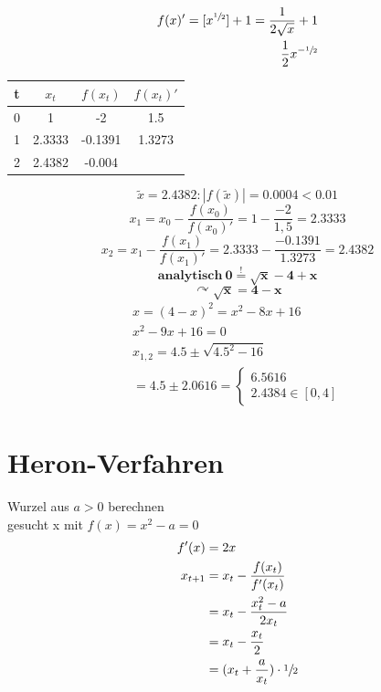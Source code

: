 \documentclass{article}
\begin{document}
	\begin{eqnarray*}
		f(x)'=[x^{\sfrac{1}{2}}] + 1 = \frac{1}{2\sqrt{x}} + 1 \\
		\frac{1}{2}x^{-\sfrac{1}{2}}
	\end{eqnarray*}
	\begin{table}[h!]
  		\centering
  		\label{tab:table1}
  		\begin{tabular}{c | c c c}
    		t & ${x_t}$ & $f(x_t)$ & $f(x_t)'$\\
    		\hline
    		0 & 1 & -2 & 1.5\\
    		1 & 2.3333 & -0.1391 & 1.3273\\
    		2 & 2.4382 & -0.004 & \\
  		\end{tabular}
	\end{table}
	\[\tilde{x} = 2.4382 : |f(\tilde{x})|=0.0004 < 0.01 \]
	\[x_1=x_0 - \frac{f(x_0)}{f(x_0)'} = 1 - \frac{-2}{1,5} = 2.3333 \]
	\[x_2=x_1 - \frac{f(x_1)}{f(x_1)'} = 2.3333 - \frac{-0.1391}{1.3273}	= 2.4382
	\]
	\[\pmb{analytisch \ 0 \stackrel{!}{=} \sqrt{x}-4+x}\]
	\[\pmb{\curvearrowright \sqrt{x} = 4-x}\]
	\begin{align*}
	x = (4-x)^2=x^2-8x+16 \\
	x^2 -9x + 16 = 0 \\
	x_{1,2}=4.5\pm\sqrt{4.5^2-16} \\
	=4.5\pm 2.0616=
    \begin{cases}
		6.5616  \\
		2.4384 \in [0,4]
	\end{cases}	
	\end{align*}
	\section{Heron-Verfahren}
	Wurzel aus \begin{math} a > 0 \end{math} berechnen \\
	gesucht x mit \begin{math} f(x) = x^2 - a = 0 \end{math}
	\begin{align*}
	f'(x)&=2x \\
	x_{t+1}&=x_t-\frac{f(x_t)}{f'(x_t)} \\
	&=x_t-\frac{x_t^2-a}{2x_t} \\
	&=x_t-\frac{x_t}{2} \\
	&=(x_t+\frac{a}{x_t})\cdot\sfrac{1}{2}
	\end{align*}
\end{document}
